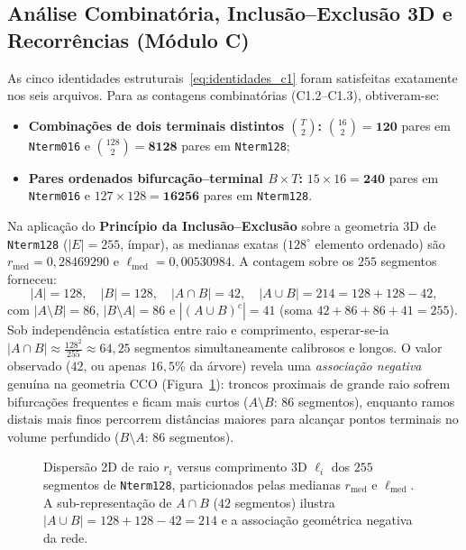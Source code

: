 \documentclass[11pt, a4paper]{article}
\begin{document}
\subsection{Análise Combinatória, Inclusão--Exclusão 3D e Recorrências (Módulo C)}

As cinco identidades estruturais~\eqref{eq:identidades_c1} foram satisfeitas exatamente nos seis arquivos. Para as contagens combinatórias (C1.2--C1.3), obtiveram-se:
\begin{itemize}[leftmargin=*]
  \item \textbf{Combinações de dois terminais distintos $\binom{T}{2}$:} $\binom{16}{2} = \mathbf{120}$ pares em \texttt{Nterm016} e $\binom{128}{2} = \mathbf{8128}$ pares em \texttt{Nterm128};
  \item \textbf{Pares ordenados bifurcação--terminal $B \times T$:} $15 \times 16 = \mathbf{240}$ pares em \texttt{Nterm016} e $127 \times 128 = \mathbf{16256}$ pares em \texttt{Nterm128}.
\end{itemize}

Na aplicação do \textbf{Princípio da Inclusão--Exclusão} sobre a geometria 3D de \texttt{Nterm128} ($|E| = 255$, ímpar), as medianas exatas ($128^{\circ}$ elemento ordenado) são $r_{\mathrm{med}} = 0{,}28469290$ e $\ell_{\mathrm{med}} = 0{,}00530984$. A contagem sobre os $255$ segmentos forneceu:
\begin{equation}
  |A| = 128, \quad |B| = 128, \quad |A \cap B| = 42, \quad |A \cup B| = 214 = 128 + 128 - 42,
\end{equation}
com $|A \setminus B| = 86$, $|B \setminus A| = 86$ e $|(A \cup B)^c| = 41$ (soma $42 + 86 + 86 + 41 = 255$). Sob independência estatística entre raio e comprimento, esperar-se-ia $|A \cap B| \approx \frac{128^2}{255} \approx 64{,}25$ segmentos simultaneamente calibrosos e longos. O valor observado ($42$, ou apenas $16{,}5\%$ da árvore) revela uma \emph{associação negativa} genuína na geometria CCO (Figura~\ref{fig:ie}): troncos proximais de grande raio sofrem bifurcações frequentes e ficam mais curtos ($A \setminus B$: $86$ segmentos), enquanto ramos distais mais finos percorrem distâncias maiores para alcançar pontos terminais no volume perfundido ($B \setminus A$: $86$ segmentos).

\begin{figure}[htbp]
  \centering
  \resizebox{0.82\linewidth}{!}{}
  \caption{Dispersão 2D de raio $r_i$ versus comprimento 3D $\ell_i$ dos $255$ segmentos de \texttt{Nterm128}, particionados pelas medianas $r_{\mathrm{med}}$ e $\ell_{\mathrm{med}}$. A sub-representação de $A \cap B$ ($42$ segmentos) ilustra $|A \cup B| = 128 + 128 - 42 = 214$ e a associação geométrica negativa da rede.}
  \label{fig:ie}
\end{figure}
\end{document}
